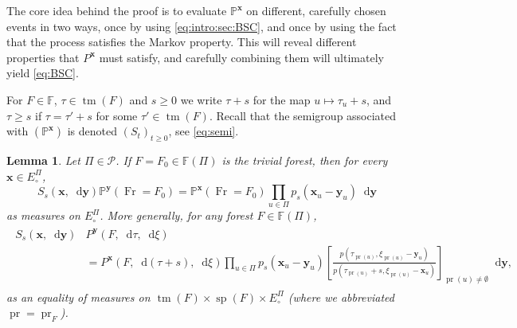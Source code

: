 \documentclass[reqno,draft]{amsart}
\numberwithin{equation}{section}
\theoremstyle{plain}
\newtheorem{lemma}[theorem]{Lemma}
\theoremstyle{remark}
\renewcommand{\P}{\mathbb{P}} %
\newcommand*\diff{\mathop{}\!\mathrm{d}}
\DeclareMathOperator{\pr}{pr}
\newcommand{\fpart}{\Pi} %
\DeclareMathOperator{\dct}{tm}
\DeclareMathOperator{\dcs}{sp}
\newcommand{\semi}{S}
\DeclareMathOperator{\fr}{Fr}
\begin{document}
The core idea behind the proof is to evaluate $\P^{\boldsymbol x}$ on different, carefully chosen events in two ways, once by using \cref{eq:intro:sec:BSC}, and once by using the fact that the process satisfies the Markov property. This will reveal different properties that $P^{\boldsymbol x}$ must satisfy, and carefully combining them will ultimately yield \cref{eq:BSC}. 


For $F\in \mathbb{F}$, $\tau\in \dct(F)$ and $s \ge 0$ we write $\tau + s$ for the map $u \mapsto \tau_u + s$, and $\tau \ge s$ if $\tau = \tau'+s$ for some $\tau'\in \dct(F)$.
Recall that the semigroup associated with $(\P^{\boldsymbol x})$ is denoted $(\semi_t)_{t\ge 0}$, see \cref{eq:semi}.
\begin{lemma}\label{lem:bsc:1}
    Let $\fpart \in \mathcal{P}$. If $F=F_0 \in \mathbb{F}(\fpart)$ is the trivial forest, then for every $\boldsymbol x \in E^\fpart_\circ $,
    \begin{equation}\label{eqprf:U1:11}
        \semi_s(\boldsymbol x,\diff \boldsymbol y) \P^{\boldsymbol y}(\fr = F_0) = \P^{\boldsymbol x}(\fr = F_0) \prod_{u\in \fpart}p_s(\boldsymbol x_u - \boldsymbol y_u) \diff \boldsymbol y
    \end{equation}
    as measures on $E^\fpart_\circ $. More generally, for any forest $F\in\mathbb{F}(\fpart)$,
    \begin{align}\begin{split}\label{eqprf:U1:3}
        \semi_s(\boldsymbol x,\diff \boldsymbol y) & P^{\boldsymbol y}(F,\diff \tau,\diff \xi)\\
                                                   &= P^{\boldsymbol x}(F,\diff (\tau+s),\diff \xi) \prod_{u\in \fpart} p_s(\boldsymbol x_u-\boldsymbol y_u) \left[ \frac{p(\tau_{\pr(u)}, \xi_{\pr(u)} - \boldsymbol y_u)}{p(\tau_{\pr(u)}+s,\xi_{\pr(u)}-\boldsymbol x_u)} \right] _{\pr(u) \neq \emptyset } \diff \boldsymbol y,
    \end{split}\end{align}
    as an equality of measures on $\dct(F)\times \dcs(F)\times E^\fpart_\circ $ (where we abbreviated $\pr = \pr_F$).
\end{lemma}
\end{document}
